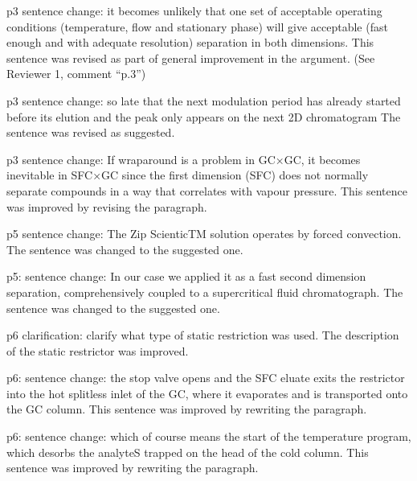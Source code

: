 \documentclass[10pt]{article}
\begin{document}
\begin{response}{p3 sentence change: it becomes unlikely that one set of
acceptable operating conditions (temperature, flow and stationary phase) will
give acceptable (fast enough and with adequate resolution) separation in both
dimensions.
	}  This sentence was revised as part of general improvement in the argument.
	(See Reviewer 1, comment ``p.3'')
\end{response}

\begin{response}{p3 sentence change: so late that the next modulation period has
already started before its elution and the peak only appears on the next 2D
chromatogram 
	}  The sentence was revised as suggested.
\end{response}

\begin{response}{p3 sentence change: If wraparound is a problem in GC×GC, it
becomes inevitable in SFC×GC since the first dimension (SFC) does not normally
separate compounds in a way that correlates with vapour pressure.
	}  This sentence was improved by revising the paragraph. 
\end{response}

\begin{response}{p5 sentence change: The Zip ScienticTM solution operates by forced convection.}  
	The sentence was changed to the suggested one. 
\end{response}

\begin{response}{p5: sentence change: In our case we applied it as a fast second
dimension separation, comprehensively coupled to a supercritical fluid
chromatograph.
	}  The sentence was changed to the suggested one. 
\end{response}

\begin{response}{p6 clarification: clarify what type of static restriction was
used.
	}  The description of the static restrictor was improved. 
\end{response}

\begin{response}{p6: sentence change: the stop valve opens and the SFC eluate
exits the restrictor into the hot splitless inlet of the GC, where it evaporates
and is transported onto the GC column.
	}  This sentence was improved by rewriting the paragraph. 
\end{response}

\begin{response}{p6: sentence change: which of course means the start of the
temperature program, which desorbs the analyteS trapped on the head of the cold
column.
	}  This sentence was improved by rewriting the paragraph.
\end{response}
\end{document}
